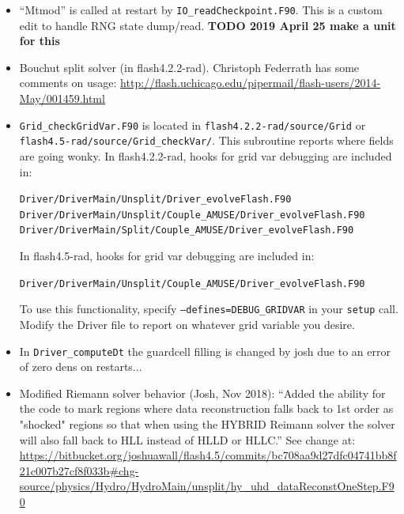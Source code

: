 \documentclass[10pt]{article}
\begin{document}
\begin{itemize}

\item
``Mtmod'' is called at restart by \texttt{IO\_readCheckpoint.F90}.
This is a custom edit to handle RNG state dump/read.
\textbf{TODO 2019 April 25 make a unit for this}


\item
Bouchut split solver (in flash4.2.2-rad).
Christoph Federrath has some comments on usage:
\url{http://flash.uchicago.edu/pipermail/flash-users/2014-May/001459.html}

\item
\texttt{Grid\_checkGridVar.F90} is located in
\texttt{flash4.2.2-rad/source/Grid}
or \texttt{flash4.5-rad/source/Grid\_checkVar/}.
This subroutine reports where fields are going wonky.
In flash4.2.2-rad, hooks for grid var debugging are included in:

\texttt{Driver/DriverMain/Unsplit/Driver\_evolveFlash.F90} \\
\texttt{Driver/DriverMain/Unsplit/Couple\_AMUSE/Driver\_evolveFlash.F90} \\
\texttt{Driver/DriverMain/Split/Couple\_AMUSE/Driver\_evolveFlash.F90}

In flash4.5-rad, hooks for grid var debugging are included in:

\texttt{Driver/DriverMain/Unsplit/Couple\_AMUSE/Driver\_evolveFlash.F90}

To use this functionality, specify \texttt{--defines=DEBUG\_GRIDVAR} in your
\texttt{setup} call.  Modify the Driver file to report on whatever grid
variable you desire.

\item
In \texttt{Driver\_computeDt} the guardcell filling is changed by josh due to
an error of zero dens on restarts...

\item
Modified Riemann solver behavior (Josh, Nov 2018):
``Added the ability for the code to mark regions where data
reconstruction falls back to 1st order as "shocked" regions
so that when using the HYBRID Reimann solver the solver will
also fall back to HLL instead of HLLD or HLLC.''
See change at:
\url{https://bitbucket.org/joshuawall/flash4.5/commits/bc708aa9d27dfc04741bb8f21c007b27cf8f033b#chg-source/physics/Hydro/HydroMain/unsplit/hy_uhd_dataReconstOneStep.F90}

\end{itemize}
\end{document}
